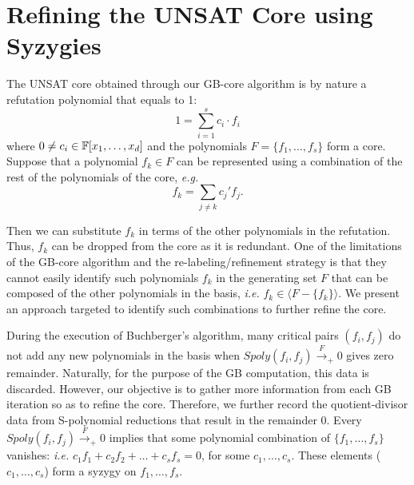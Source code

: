 \section{Refining the UNSAT Core using Syzygies}
\label{sec:syz}


The UNSAT core obtained through our GB-core algorithm is by nature a
refutation polynomial that equals to 1:  
$$1 = \sum_{i=1}^s c_i\cdot f_i$$
where $0 \neq c_i \in {\mathbb{F}}[x_1,\dots,x_d]$ and the polynomials
$F = \{f_1,\dots,f_s\}$ form a core. Suppose that a polynomial 
$f_k \in F$ can be represented using a combination of the rest of the
polynomials of the core, {\it e.g.}
$$f_k = \sum_{j\neq k} c_j'f_j.$$

Then we can substitute $f_k$ in terms of the other polynomials in the
refutation. Thus, $f_k$ can be dropped from the core as it is 
redundant. One of the limitations of the GB-core algorithm and the
re-labeling/refinement strategy is that they cannot easily identify
such polynomials $f_k$ in the generating set $F$ that can be composed
of the other polynomials in the basis, {\it i.e.}
$f_k \in \langle F-\{f_k\} \rangle$. We present an approach targeted
to identify such combinations to further refine the core. 
 
 
During the execution of Buchberger's algorithm, many critical pairs
$(f_i,f_j)$ do not add any new polynomials in the basis when
$Spoly(f_i,f_j)\xrightarrow{F}_+0$ gives zero remainder. Naturally,
for the purpose of the GB computation, this data is
discarded. However, our objective is to gather more information from
each GB iteration so as to refine the core. Therefore, we further
record the quotient-divisor data from S-polynomial reductions that
result in the remainder 0. Every $Spoly(f_i,f_j)\xrightarrow{F}_+0$
implies that some polynomial combination of $\{f_1,\dots,f_s\}$
vanishes: {\it i.e.} $c_1f_1 + c_2f_2 + \dots+c_sf_s=0$, for some
$c_1,\dots,c_s$. These elements ($c_1,\dots,c_s$) form a syzygy on $f_1,\dots,f_s$. 

